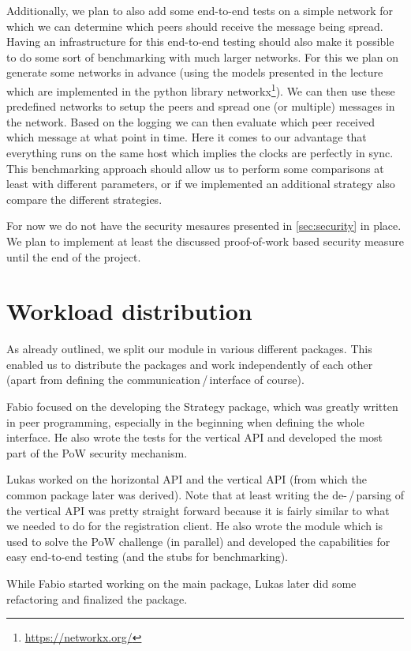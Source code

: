 \documentclass[a4paper,english,10pt,NET]{tumarticle}
\begin{document}
Additionally, we plan to also add some end-to-end tests on a simple network for which we can determine which peers should receive the message being spread.
Having an infrastructure for this end-to-end testing should also make it possible to do some sort of benchmarking with much larger networks.
For this we plan on generate some networks in advance (using the models presented in the lecture which are implemented in the python library networkx\footnote{\url{https://networkx.org/}}).
We can then use these predefined networks to setup the peers and spread one (or multiple) messages in the network.
Based on the logging we can then evaluate which peer received which message at what point in time.
Here it comes to our advantage that everything runs on the same host which implies the clocks are perfectly in sync.
This benchmarking approach should allow us to perform some comparisons at least with different parameters, or if we implemented an additional strategy also compare the different strategies.

For now we do not have the security mesaures presented in \cref{sec:security} in place.
We plan to implement at least the discussed proof-of-work based security measure until the end of the project.

\section{Workload distribution}
As already outlined, we split our module in various different packages.
This enabled us to distribute the packages and work independently of each other (apart from defining the communication\,/\,interface of course).

Fabio focused on the developing the Strategy package, which was greatly written in peer programming, especially in the beginning when defining the whole interface. He also wrote the tests for the vertical API and developed the most part of the PoW security mechanism.

Lukas worked on the horizontal API and the vertical API (from which the common package later was derived).
Note that at least writing the de-\,/\,parsing of the vertical API was pretty straight forward because it is fairly similar to what we needed to do for the registration client.
He also wrote the module which is used to solve the PoW challenge (in parallel) and developed the capabilities for easy end-to-end testing (and the stubs for benchmarking).

While Fabio started working on the main package, Lukas later did some refactoring and finalized the package.
\end{document}
